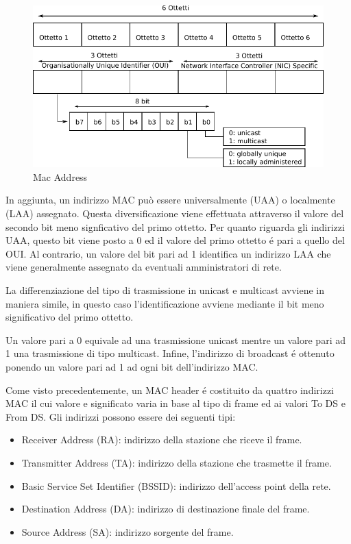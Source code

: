 \begin{figure}[!htb]
	\centering
	\includegraphics{images/img7.pdf}
	\caption{Mac Address}
	\label{fig:macaddress}
\end{figure}

In aggiunta, un indirizzo MAC pu\`o essere universalmente (UAA) o localmente (LAA) assegnato.
Questa diversificazione viene effettuata attraverso il valore del secondo bit meno signficativo del primo ottetto.
Per quanto riguarda gli indirizzi UAA, questo bit viene posto a 0 ed il valore del primo ottetto \'e pari a quello del OUI.
Al contrario, un valore del bit pari ad 1 identifica un indirizzo LAA che viene generalmente assegnato da eventuali amministratori di rete.

La differenziazione del tipo di trasmissione in unicast e multicast avviene in maniera simile, in questo caso l'identificazione avviene mediante il bit meno significativo del primo ottetto.

Un valore pari a 0 equivale ad una trasmissione unicast mentre un valore pari ad 1 una trasmissione di tipo multicast.
Infine, l'indirizzo di broadcast \'e ottenuto ponendo un valore pari ad 1 ad ogni bit dell'indirizzo MAC.

Come visto precedentemente, un MAC header \'e costituito da quattro indirizzi MAC il cui valore e significato varia in base al tipo di frame ed ai valori To DS e From DS.
Gli indirizzi possono essere dei seguenti tipi:
\begin{itemize}
	\item Receiver Address (RA): indirizzo della stazione che riceve il frame.
	\item Transmitter Address (TA): indirizzo della stazione che trasmette il frame.
	\item Basic Service Set Identifier (BSSID): indirizzo dell'access point della rete.
	\item Destination Address (DA): indirizzo di destinazione finale del frame.
	\item Source Address (SA): indirizzo sorgente del frame.
\end{itemize}

